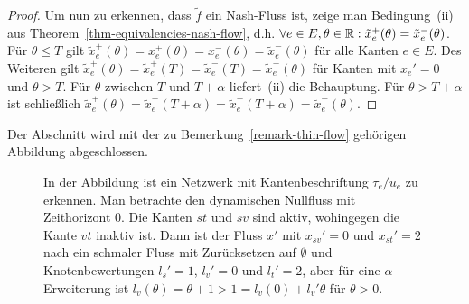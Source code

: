 \begin{proof}
	Um nun zu erkennen, dass $\tilde{f}$ ein Nash-Fluss ist, zeige man Bedingung~(ii) aus Theorem~\ref{thm-equivalencies-nash-flow}, d.h. $\forall e\in E, \theta\in\mathbb{R}: \tilde{x}_e^+(\theta) = \tilde{x}_e^-(\theta)$.
	Für $\theta \leq T$ gilt $\tilde{x}_e^+(\theta) = x_e^+(\theta) = x_e^-(\theta) = \tilde{x}_e^-(\theta)$ für alle Kanten $e\in E$.
	Des Weiteren gilt $\tilde{x}_e^+(\theta) = \tilde{x}_e^+(T) = \tilde{x}_e^-(T) = \tilde{x}_e^-(\theta)$ für Kanten mit $x_{e}' = 0$ und $\theta > T$.
	Für $\theta$ zwischen $T$ und $T+\alpha$ liefert~(ii) die Behauptung.
	Für $\theta > T+\alpha$ ist schließlich $\tilde{x}_e^+(\theta) = \tilde{x}_e^+(T + \alpha) = \tilde{x}_e^-(T+\alpha) = \tilde{x}_e^-(\theta)$.
\end{proof}

Der Abschnitt wird mit der zu Bemerkung~\ref{remark-thin-flow} gehörigen Abbildung abgeschlossen.
\begin{figure}[h!]
	\centering
	\caption{In der Abbildung ist ein Netzwerk mit Kantenbeschriftung $\tau_e / u_e$ zu erkennen.
		Man betrachte den dynamischen Nullfluss mit Zeithorizont $0$.
		Die Kanten $st$ und $sv$ sind aktiv, wohingegen die Kante $vt$ inaktiv ist.
		Dann ist der Fluss $x'$ mit $x_{sv}'=0$ und $x_{st}'=2$ nach \cite[Definition 6]{Koch2011} ein schmaler Fluss mit Zurücksetzen auf $\emptyset$ und Knotenbewertungen $l_s' = 1$, $l_v' = 0$ und $l_t' = 2$, aber für eine $\alpha$-Erweiterung ist $l_v(\theta) = \theta + 1 > 1 = l_v(0) + l_v' \theta$ für $\theta > 0$.} 
	\label{figure-labels}
\end{figure}